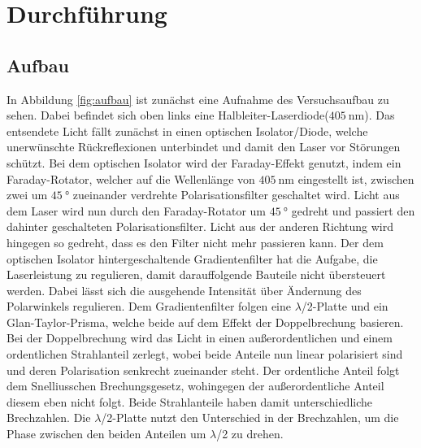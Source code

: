 \section{Durchführung}
\label{sec:Durchführung}

\subsection{Aufbau}
\label{sec:Aufbau}

In Abbildung \ref{fig:aufbau} ist zunächst eine Aufnahme des Versuchsaufbau zu
sehen. Dabei befindet sich oben links eine Halbleiter-Laserdiode($\SI{405}{\nano\meter}$).
Das entsendete Licht fällt zunächst in einen optischen Isolator/Diode, welche
unerwünschte Rückreflexionen unterbindet und damit den Laser vor Störungen schützt.
Bei dem optischen Isolator wird der Faraday-Effekt genutzt, indem ein Faraday-Rotator,
welcher auf die Wellenlänge von $\SI{405}{\nano\meter}$ eingestellt ist,
zwischen zwei um $\SI{45}{\degree}$ zueinander verdrehte Polarisationsfilter
geschaltet wird. Licht aus dem Laser wird nun durch den Faraday-Rotator
um $\SI{45}{\degree}$ gedreht und passiert den dahinter geschalteten Polarisationsfilter.
Licht aus der anderen Richtung wird hingegen so gedreht, dass es den Filter nicht
mehr passieren kann.
Der dem optischen Isolator hintergeschaltende Gradientenfilter hat die Aufgabe,
die Laserleistung zu regulieren, damit darauffolgende Bauteile nicht übersteuert
werden. Dabei lässt sich die ausgehende Intensität über Ändernung des Polarwinkels
regulieren. Dem Gradientenfilter folgen eine $\lambda$/2-Platte und ein
Glan-Taylor-Prisma, welche beide auf dem Effekt der Doppelbrechung basieren. Bei
der Doppelbrechung wird das Licht in einen außerordentlichen und einem ordentlichen
Strahlanteil zerlegt, wobei beide Anteile nun linear polarisiert sind und deren
Polarisation senkrecht zueinander steht. Der ordentliche Anteil folgt dem
Snelliusschen Brechungsgesetz, wohingegen der außerordentliche Anteil diesem
eben nicht folgt. Beide Strahlanteile haben damit unterschiedliche Brechzahlen.
Die $\lambda$/2-Platte nutzt den Unterschied in der Brechzahlen, um die Phase
zwischen den beiden Anteilen um $\lambda$/2 zu drehen.

